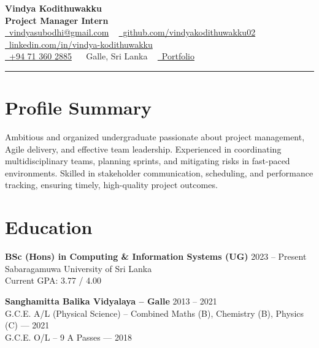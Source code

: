 \documentclass[letterpaper,11pt]{article}
\begin{document}
\fontsize{11}{13}\selectfont
\justifying

\begin{center}
{\Huge\color{accentTitle}\textbf{Vindya Kodithuwakku}}\\[3pt]
{\large\textbf{Project Manager Intern}}\\[4pt]
\href{mailto:vindyasubodhi@gmail.com}{\faEnvelope~vindyasubodhi@gmail.com} ~
\href{https://github.com/vindyakodithuwakku02}{\faGithub~github.com/vindyakodithuwakku02} ~
\href{https://www.linkedin.com/in/vindya-kodithuwakku-bb6187202}{\faLinkedin~linkedin.com/in/vindya-kodithuwakku}\\[2pt]
\href{tel:+94713602885}{\faPhone~+94 71 360 2885} ~
\faMapMarker*~Galle, Sri Lanka ~
\href{https://vindyakodithuwakku02.github.io/my_portfolio/}{\faGlobe~Portfolio}\\[4pt]
{\color{accentLine}\hrule}
\end{center}

\fontsize{12.5}{13.5}\selectfont

\vspace{-20pt}
\section{Profile Summary}
\vspace{-2pt}
\justifying
Ambitious and organized undergraduate passionate about project management, Agile delivery, and effective team leadership. Experienced in coordinating multidisciplinary teams, planning sprints, and mitigating risks in fast-paced environments. Skilled in stakeholder communication, scheduling, and performance tracking, ensuring timely, high-quality project outcomes.

\section{Education}
\vspace{-1pt}

\textbf{BSc (Hons) in Computing \& Information Systems (UG)} \hfill 2023 – Present\\
Sabaragamuwa University of Sri Lanka\\
Current GPA: 3.77 / 4.00

\vspace{8pt}
\noindent\textbf{Sanghamitta Balika Vidyalaya – Galle} \hfill 2013 – 2021\\
G.C.E. A/L (Physical Science) – Combined Maths (B), Chemistry (B), Physics (C) — 2021\\
G.C.E. O/L – 9 A Passes — 2018
\end{document}
